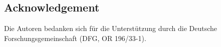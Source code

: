 \documentclass[fleqn,a4paper,10pt]{article}
\begin{document}
\begin{multicols}{2}

\section{Acknowledgement}

Die Autoren bedanken sich für die Unterstützung durch die Deutsche Forschungsgemeinschaft (DFG, OR 196/33-1).






\end{multicols}
\end{document}
